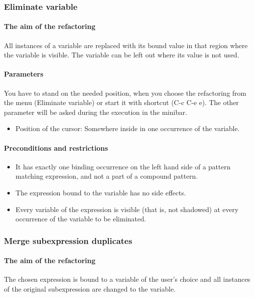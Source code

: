 \documentclass[12pt]{article}
\begin{document}
\subsubsection{Eliminate variable}
\paragraph{The aim of the refactoring}
All instances of a variable are replaced with its bound value in that region where the variable is visible. 
The variable can be left out where its value is not used.

\paragraph{Parameters}
You have to stand on the needed position, when you choose the refactoring from the menu (Eliminate variable) 
or start it with shortcut (C-c C-e e).
The other parameter will be asked during the execution in the minibar.
\begin{itemize}
	\item Position of the cursor: Somewhere inside in one occurrence of the variable.
\end{itemize}
\paragraph{Preconditions and restrictions}
\begin{itemize}
	\item It has exactly one binding occurrence on the left hand side of a pattern matching expression, and not a part of a compound pattern.
	\item The expression bound to the variable has no side effects. 
	\item Every variable of the expression is visible (that is, not shadowed) at every occurrence of the variable to be eliminated. 
\end{itemize}


\subsubsection{Merge subexpression duplicates}
\paragraph{The aim of the refactoring}
The chosen expression is bound to a variable of the user's choice and all
instances of the original subexpression are changed to the variable.
\end{document}
